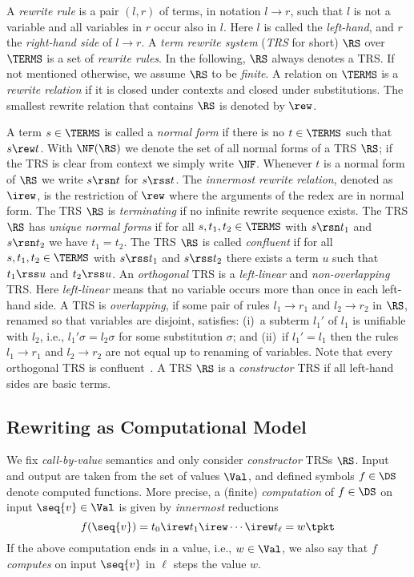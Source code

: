 \documentclass{LMCS}
\begin{document}
A \emph{rewrite rule} is a pair $(l,r)$ of terms, in notation $l \to r$, 
such that $l$ is not a variable and all variables in $r$ occur also in $l$.
Here $l$ is called the \emph{left-hand}, and $r$ the \emph{right-hand side} of $l \to r$.
A \emph{term rewrite system} (\emph{TRS} for short) $\RS$ over
$\TERMS$ is a set of \emph{rewrite rules}.
In the following, $\RS$ always denotes a TRS.\@
If not mentioned otherwise, we assume $\RS$ to be \emph{finite}.
A relation on $\TERMS$ is a \emph{rewrite relation} if it is
closed under contexts and closed under substitutions. 
The smallest rewrite relation that contains $\RS$ is denoted by
$\rew$. 

A term $s \in \TERMS$ is called a \emph{normal form} if there is no
$t \in \TERMS$ such that $s \rew t$. 
With $\NF(\RS)$ we denote the set of all normal forms of a TRS $\RS$;
if the TRS is clear from context we simply write $\NF$.
Whenever $t$ is a normal form of $\RS$ we write $s \rsn t$ for $s \rss t$.
The \emph{innermost rewrite relation}, denoted as $\irew$, is the restriction
of $\rew$ where the arguments of the redex are in normal form.
The TRS $\RS$ is \emph{terminating} if no infinite rewrite sequence exists.
The TRS $\RS$ has \emph{unique normal forms} if for all 
$s, t_1, t_2 \in \TERMS$ with $s \rsn t_1$ and 
$s \rsn t_2$ we have $t_1 = t_2$.
The TRS $\RS$ is called \emph{confluent} if for all $s, t_1, t_2 \in \TERMS$
with $s \rss t_1$ and $s \rss t_2$ there exists a term $u$ such that
$t_1 \rss u$ and $t_2 \rss u$. An \emph{orthogonal} TRS is 
a \emph{left-linear} and \emph{non-overlapping} TRS. 
Here \emph{left-linear} means that no variable occurs more than once in each left-hand side. 
A TRS is \emph{overlapping}, if some pair of rules $l_1 \to r_1$ and $l_2 \to r_2$ in $\RS$, renamed 
so that variables are disjoint, satisfies:
(i)~a subterm $l_1'$ of $l_1$ is unifiable with $l_2$, i.e., $l_1'\sigma = l_2\sigma$ for some substitution $\sigma$; and
(ii)~if $l_1' = l_1$ then the rules $l_1 \to r_1$ and $l_2 \to r_2$ are not equal up to renaming of variables.
Note that every orthogonal TRS is confluent~\cite{BN98}.
A TRS $\RS$ is a \emph{constructor} TRS if all left-hand sides are basic terms.

\subsection{Rewriting as Computational Model}

We fix \emph{call-by-value} semantics and only consider 
\emph{constructor} TRSs $\RS$. Input and output are taken from the set of 
values $\Val$, and defined symbols $f \in \DS$ denote computed functions. 
More precise, a (finite) \emph{computation} of $f\in \DS$ on input $\seq{v} \in \Val$
is given by \emph{innermost} reductions
$$
  f(\seq{v}) = t_0 \irew t_1 \irew \cdots \irew t_\ell = w \tpkt
$$
If the above computation ends in a value, i.e., $w \in \Val$, 
we also say that $f$ \emph{computes} on input $\seq{v}$ in $\ell$ steps the value $w$.
\end{document}
